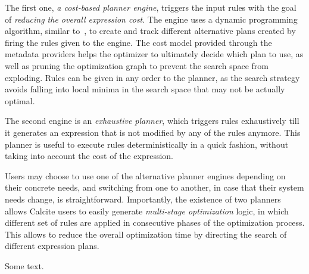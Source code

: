 The first one, \textit{a cost-based planner engine}, triggers the input rules with the goal of \textit{reducing the overall expression cost}. The engine uses a dynamic programming algorithm, similar to~\cite{Graefe93thevolcano}, to create and track different alternative plans created by firing the rules given to the engine. The cost model provided through the metadata providers helps the optimizer to ultimately decide which plan to use, as well as pruning the optimization graph to prevent the search space from exploding. Rules can be given in any order to the planner, as the search strategy avoids falling into local minima in the search space that may not be actually optimal.

The second engine is an \textit{exhaustive planner}, which triggers rules exhaustively till it generates an expression that is not modified by any of the rules anymore. This planner is useful to execute rules deterministically in a quick fashion, without taking into account the cost of the expression.

Users may choose to use one of the alternative planner engines depending on their concrete needs, and switching from one to another, in case that their system needs change, is straightforward. Importantly, the existence of two planners allows Calcite users to easily generate \textit{multi-stage optimization} logic, in which different set of rules are applied in consecutive phases of the optimization process. This allows to reduce the overall optimization time by directing the search of different expression plans.



Some text.
